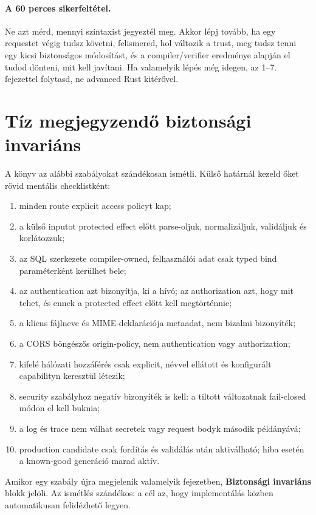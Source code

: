 \paragraph{A 60 perces sikerfeltétel.}
Ne azt mérd, mennyi szintaxist jegyeztél meg. Akkor lépj tovább, ha egy requestet végig tudsz követni, felismered, hol változik a trust, meg tudsz tenni egy kicsi biztonságos módosítást, és a compiler/verifier eredménye alapján el tudod dönteni, mit kell javítani. Ha valamelyik lépés még idegen, az 1--7. fejezettel folytasd, ne advanced Rust kitérővel.

\section*{Tíz megjegyzendő biztonsági invariáns}

A könyv az alábbi szabályokat szándékosan ismétli. Külső határnál kezeld őket rövid mentális checklistként:

\begin{enumerate}
  \item minden route explicit access policyt kap;
  \item a külső inputot protected effect előtt parse-oljuk, normalizáljuk, validáljuk és korlátozzuk;
  \item az SQL szerkezete compiler-owned, felhasználói adat csak typed bind paraméterként kerülhet bele;
  \item az authentication azt bizonyítja, ki a hívó; az authorization azt, hogy mit tehet, és ennek a protected effect előtt kell megtörténnie;
  \item a kliens fájlneve és MIME-deklarációja metaadat, nem bizalmi bizonyíték;
  \item a CORS böngészős origin-policy, nem authentication vagy authorization;
  \item kifelé hálózati hozzáférés csak explicit, névvel ellátott és konfigurált capabilityn keresztül létezik;
  \item security szabályhoz negatív bizonyíték is kell: a tiltott változatnak fail-closed módon el kell buknia;
  \item a log és trace nem válhat secretek vagy request bodyk második példányává;
  \item production candidate csak fordítás és validálás után aktiválható; hiba esetén a known-good generáció marad aktív.
\end{enumerate}

Amikor egy szabály újra megjelenik valamelyik fejezetben, \textbf{Biztonsági invariáns} blokk jelöli. Az ismétlés szándékos: a cél az, hogy implementálás közben automatikusan felidézhető legyen.


